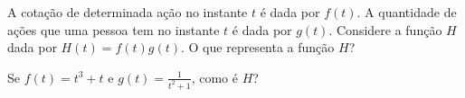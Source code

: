 A cotação de determinada ação no instante $t$ é dada por $f(t)$.
A quantidade de ações que uma pessoa tem no instante $t$ é dada por $g(t)$.
Considere a função $H$ dada por $H(t)=f(t)g(t)$.
O que representa a função $H$?

Se $f(t)=t^3+t$ e $g(t)=\frac{1}{t^2+1}$, como é $H$?
